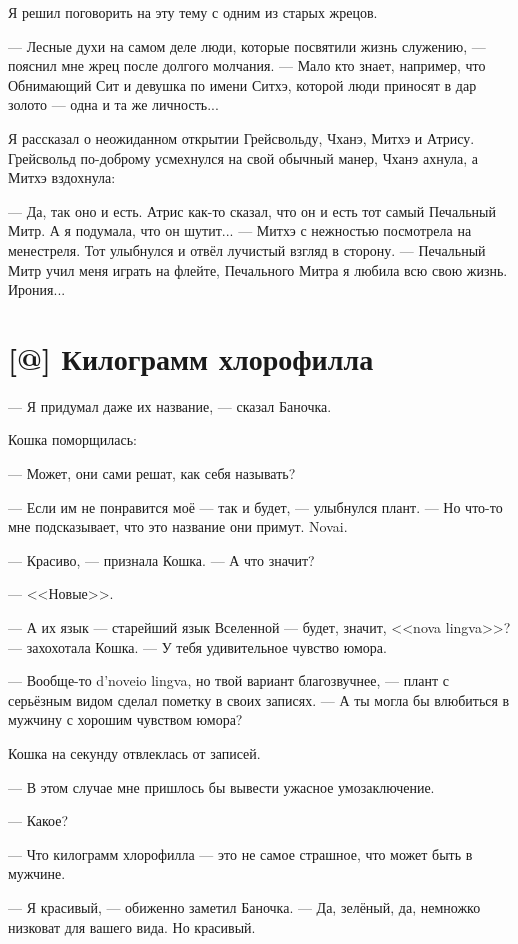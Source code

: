 Я решил поговорить на эту тему с одним из старых жрецов.

--- Лесные духи на самом деле люди, которые посвятили жизнь служению, --- пояснил мне жрец после долгого молчания.
--- Мало кто знает, например, что Обнимающий Сит и девушка по имени Ситхэ, которой люди приносят в дар золото --- одна и та же личность...

Я рассказал о неожиданном открытии Грейсвольду, Чханэ, Митхэ и Атрису.
Грейсвольд по-доброму усмехнулся на свой обычный манер, Чханэ ахнула, а Митхэ вздохнула:

--- Да, так оно и есть.
Атрис как-то сказал, что он и есть тот самый Печальный Митр.
А я подумала, что он шутит... --- Митхэ с нежностью посмотрела на менестреля.
Тот улыбнулся и отвёл лучистый взгляд в сторону.
--- Печальный Митр учил меня играть на флейте, Печального Митра я любила всю свою жизнь.
Ирония...

\section{[@] Килограмм хлорофилла}

--- Я придумал даже их название, --- сказал Баночка.

Кошка поморщилась:

--- Может, они сами решат, как себя называть?

--- Если им не понравится моё --- так и будет, --- улыбнулся плант.
--- Но что-то мне подсказывает, что это название они примут.
Novai.

--- Красиво, --- признала Кошка.
--- А что значит?

--- <<Новые>>.

--- А их язык --- старейший язык Вселенной --- будет, значит, <<nova lingva>>? --- захохотала Кошка.
--- У тебя удивительное чувство юмора.

--- Вообще-то d'noveio lingva, но твой вариант благозвучнее, --- плант с серьёзным видом сделал пометку в своих записях.
--- А ты могла бы влюбиться в мужчину с хорошим чувством юмора?

Кошка на секунду отвлеклась от записей.

--- В этом случае мне пришлось бы вывести ужасное умозаключение.

--- Какое?

--- Что килограмм хлорофилла --- это не самое страшное, что может быть в мужчине.

--- Я красивый, --- обиженно заметил Баночка.
--- Да, зелёный, да, немножко низковат для вашего вида.
Но красивый.

